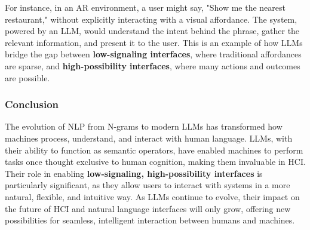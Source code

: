 For instance, in an AR environment, a user might say, "Show me the nearest restaurant," without explicitly interacting with a visual affordance.
The system, powered by an LLM, would understand the intent behind the phrase, gather the relevant information, and present it to the user.
This is an example of how LLMs bridge the gap between \textbf{low-signaling interfaces}, where traditional affordances are sparse, and \textbf{high-possibility interfaces}, where many actions and outcomes are possible.

\subsubsection{ Conclusion}

The evolution of NLP from N-grams to modern LLMs has transformed how machines process, understand, and interact with human language.
LLMs, with their ability to function as semantic operators, have enabled machines to perform tasks once thought exclusive to human cognition, making them invaluable in HCI.
Their role in enabling \textbf{low-signaling, high-possibility interfaces} is particularly significant, as they allow users to interact with systems in a more natural, flexible, and intuitive way.
As LLMs continue to evolve, their impact on the future of HCI and natural language interfaces will only grow, offering new possibilities for seamless, intelligent interaction between humans and machines.